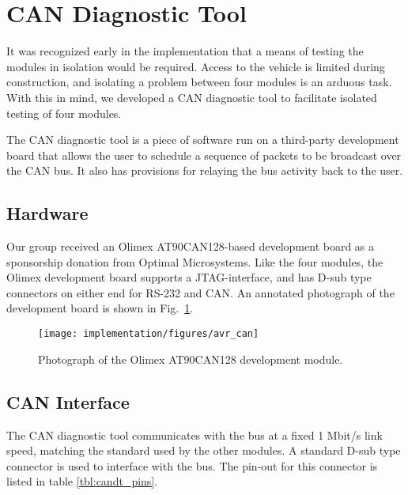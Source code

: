 \section{CAN Diagnostic Tool}
\label{sec:implementation_candt}

It was recognized early in the implementation that a means of testing the modules in isolation would be required. Access to the vehicle is limited during construction, and isolating a problem between four modules is an arduous task. With this in mind, we developed a CAN diagnostic tool to facilitate isolated testing of four modules.

The CAN diagnostic tool is a piece of software run on a third-party development board that allows the user to schedule a sequence of packets to be broadcast over the CAN bus. It also has provisions for relaying the bus activity back to the user.

\subsection{Hardware}

Our group received an Olimex AT90CAN128-based development board as a sponsorship donation from Optimal Microsystems. Like the four modules, the Olimex development board supports a JTAG-interface, and has D-sub type connectors on either end for RS-232 and CAN. An annotated photograph of the development board is shown in Fig.\ \ref{fig:impl_avr_can}.

\begin{figure}[H]
\centering
\texttt{[image: implementation/figures/avr\_can]}
\caption{Photograph of the Olimex AT90CAN128 development module.}
\label{fig:impl_avr_can}
\end{figure}

\subsection{CAN Interface}

The CAN diagnostic tool communicates with the bus at a fixed 1 Mbit/s link speed, matching the standard used by the other modules. A standard D-sub type connector is used to interface with the bus. The pin-out for this connector is listed in table \ref{tbl:candt_pins}. 

